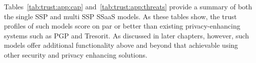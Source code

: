 Tables~\ref{tab:trust:app:cap} and~\ref{tab:trust:app:threats} provide
a summary of both the single SSP and multi SSP SSaaS models. As these
tables show, the trust profiles of such models score on par or better
than existing privacy-enhancing systems such as PGP and Tresorit. As
discussed in later chapters, however, such models offer additional
functionality above and beyond that achievable using other security
and privacy enhancing solutions.

